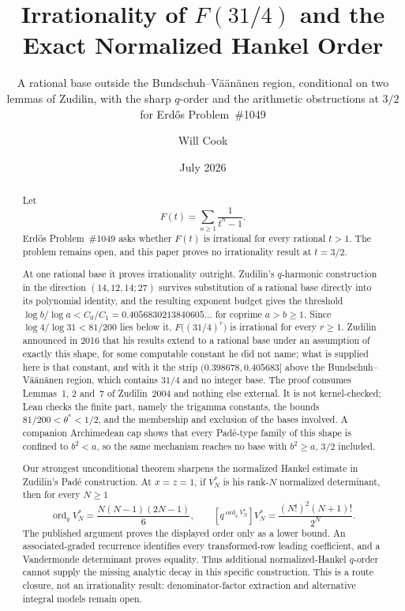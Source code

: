 \documentclass[11pt]{article}
\title{Irrationality of $F(31/4)$ and the\\Exact Normalized Hankel Order}
\subtitle{A rational base outside the Bundschuh--V\"a\"an\"anen region,
conditional on two lemmas of Zudilin, with the sharp $q$-order and the
arithmetic obstructions at $3/2$ for Erd\H{o}s Problem~\#1049}
\author{Will Cook}
\date{July 2026}
\begin{document}
\maketitle
\noteprovenance

\begin{abstract}
\noindent
Let
\[
 F(t)=\sum_{n\ge1}\frac1{t^n-1}.
\]
Erd\H{o}s Problem~\#1049 asks whether \(F(t)\) is irrational for every
rational \(t>1\).  The problem remains open, and this paper proves no
irrationality result at \(t=3/2\).

At one rational base it proves irrationality outright.  Zudilin's
$q$-harmonic construction in the direction \((14,12,14;27)\) survives
substitution of a rational base directly into its polynomial identity, and the
resulting exponent budget gives the threshold
\(\log b/\log a<C_0/C_1=0.4056830213840605\ldots\) for coprime \(a>b\ge1\).
Since \(\log 4/\log 31<81/200\) lies below it, \(F\bigl((31/4)^r\bigr)\) is
irrational for every \(r\ge1\).  Zudilin announced in 2016 that his results
extend to a rational base under an assumption of exactly this shape, for some
computable constant he did not name; what is supplied here is that constant,
and with it the strip \((0.398678,0.405683]\) above the
Bundschuh--V\"a\"an\"anen region, which contains \(31/4\) and no integer base.
The proof consumes Lemmas~1, 2 and~7 of Zudilin~2004 and nothing else external.
It is not kernel-checked; Lean checks the finite part, namely the trigamma
constants, the bounds \(81/200<\theta^*<1/2\), and the membership and exclusion
of the bases involved.  A companion Archimedean cap shows that every Pad\'e-type
family of this shape is confined to \(b^2<a\), so the same mechanism reaches no
base with \(b^2\ge a\), \(3/2\) included.

Our strongest unconditional theorem sharpens the normalized Hankel estimate in Zudilin's
Pad\'e construction.  At \(x=z=1\), if \(V_N^*\) is his rank-\(N\)
normalized determinant, then for every \(N\ge1\)
\[
 \operatorname{ord}_q V_N^*=\frac{N(N-1)(2N-1)}6,
 \qquad
 [q^{\operatorname{ord}_q V_N^*}]V_N^*
   =\frac{(N!)^2(N+1)!}{2^N}.
\]
The published argument proves the displayed order only as a lower bound.  An
associated-graded recurrence identifies every transformed-row leading
coefficient, and a Vandermonde determinant proves equality.  Thus additional
normalized-Hankel \(q\)-order cannot supply the missing analytic decay in this
specific construction.  This is a route closure, not an irrationality result:
denominator-factor extraction and alternative integral models remain open.


\end{abstract}
\end{document}
